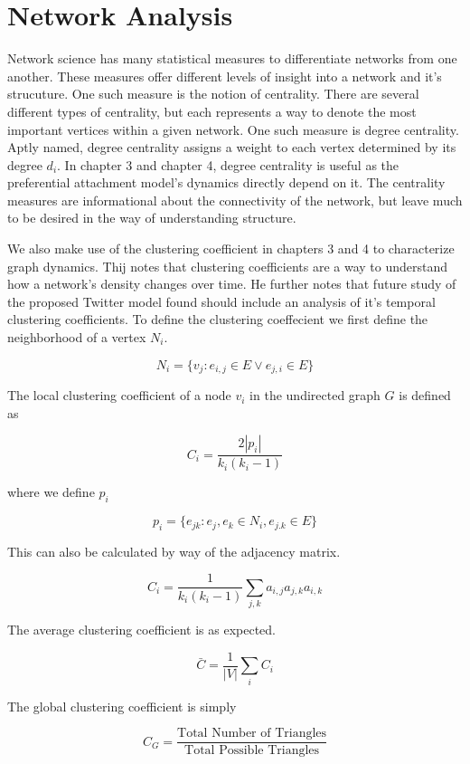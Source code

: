 \section{Network Analysis}
\label{section:Network Analysis}
Network science has many statistical measures to differentiate networks from one another. These
measures offer different levels of insight into a network and it's strucuture.
One such measure is the notion of centrality. There are several different types
of centrality, but each represents a way to denote the most important vertices within a 
given network. One such measure is degree centrality. Aptly named, degree centrality 
assigns a weight to each vertex determined by its degree $d_i$. In chapter 3 and chapter 4, degree
centrality is useful as the preferential attachment model's dynamics directly depend on it. The centrality 
measures are informational about the connectivity of the network, but leave much to be desired in the way 
of understanding structure.

We also make use of the clustering coefficient in chapters 3 and 4 to characterize graph dynamics. Thij \cite{thij}
notes that clustering coefficients are a way to understand how a network's density changes over time. He 
further notes that future study of the proposed Twitter model found should include an analysis of it's temporal clustering coefficients.
To define the clustering coeffecient we first define the neighborhood of a vertex $N_i$.

$$
N_i = \{v_j: e_{i,j}\in E \lor e_{j,i} \in E\}
$$

\noindent The local clustering coefficient of a node $v_i$ in the undirected graph $G$ is defined as 

$$
C_i = \frac{2|p_i|}{k_i(k_i-1)}
$$

\noindent where we define $p_i$

$$
p_i = \{ e_{jk}: e_j, e_k \in N_i, e_{j.k}\in E\}
$$

\noindent This can also be calculated by way of the adjacency matrix.

$$
C_i =\frac{1}{k_i(k_i-1)} \sum_{j,k} a_{i,j}a_{j,k}a_{i,k}
$$

\noindent The average clustering coefficient is as expected.

$$
{\bar C} = \frac{1}{|V|}\sum_{i} C_i
$$

\noindent The global clustering coefficient is simply

$$
C_{G} = \frac{\text{Total Number of Triangles}}{\text{Total Possible Triangles}}
$$

